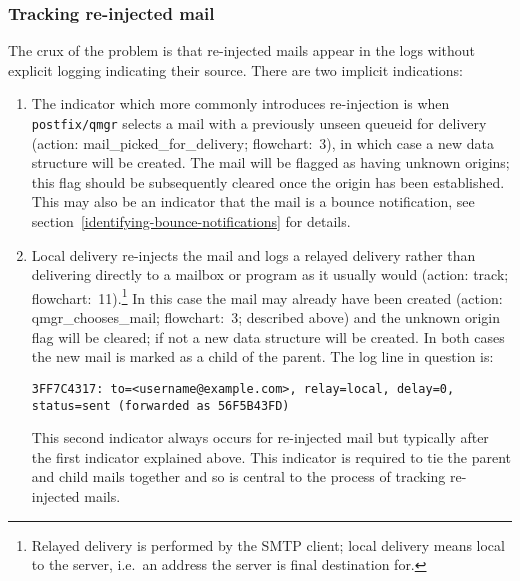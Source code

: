 \documentclass[a4paper,12pt,draft]{article}
\begin{document}
\subsubsection{Tracking re-injected mail}

\label{tracking re-injected mail}

The crux of the problem is that re-injected mails appear in the logs
without explicit logging indicating their source.  There are two implicit
indications:

\begin{enumerate}

    \item The indicator which more commonly introduces re-injection is when 
        \texttt{postfix/qmgr}
        selects a mail with a previously unseen queueid for delivery
        (action: mail\_picked\_for\_delivery; flowchart:~3), in which case
        a new data structure will be created.  The mail will be flagged as
        having unknown origins; this flag should be subsequently cleared
        once the origin has been established.  This may also be an
        indicator that the mail is a bounce notification, see
        section~\ref{identifying-bounce-notifications} for details.

    \item Local delivery re-injects the mail and logs a relayed delivery
        rather than delivering directly to a mailbox or program as it
        usually would (action: track; flowchart:~11).\footnote{Relayed
        delivery is performed by the SMTP client; local delivery means
        local to the server, i.e.\ an address the server is final
        destination for.} In this case the mail may already have been
        created (action: qmgr\_chooses\_mail; flowchart:~3; described
        above) and the unknown origin flag will be cleared; if not a new
        data structure will be created.  In both cases the new mail is
        marked as a child of the parent.  The log line in question is:

        \texttt{3FF7C4317: to=<username@example.com>, relay=local, \newline 
        delay=0, status=sent (forwarded as 56F5B43FD)}

        This second indicator always occurs for re-injected mail but
        typically after the first indicator explained above.  This
        indicator is required to tie the parent and child mails together
        and so is central to the process of tracking re-injected mails.

\end{enumerate}
\end{document}

